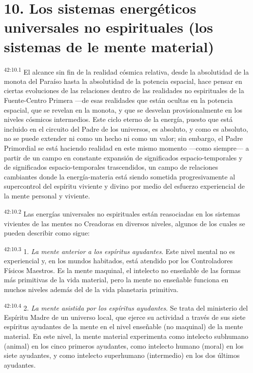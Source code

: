 \section*{10. Los sistemas energéticos universales no espirituales (los sistemas de le mente material)}
\par
\textsuperscript{42:10.1} El alcance sin fin de la realidad cósmica relativa, desde la absolutidad de la monota del Paraíso hasta la absolutidad de la potencia espacial, hace pensar en ciertas evoluciones de las relaciones dentro de las realidades no espirituales de la Fuente-Centro Primera ---de esas realidades que están ocultas en la potencia espacial, que se revelan en la monota, y que se desvelan provisionalmente en los niveles cósmicos intermedios. Este ciclo eterno de la energía, puesto que está incluido en el circuito del Padre de los universos, es absoluto, y como es absoluto, no se puede extender ni como un hecho ni como un valor; sin embargo, el Padre Primordial se está haciendo realidad en este mismo momento ---como siempre--- a partir de un campo en constante expansión de significados espacio-temporales y de significados espacio-temporales trascendidos, un campo de relaciones cambiantes donde la energía-materia está siendo sometida progresivamente al supercontrol del espíritu viviente y divino por medio del esfuerzo experiencial de la mente personal y viviente.

\par
\textsuperscript{42:10.2} Las energías universales no espirituales están reasociadas en los sistemas vivientes de las mentes no Creadoras en diversos niveles, algunos de los cuales se pueden describir como sigue:

\par
\textsuperscript{42:10.3} 1. \textit{La mente anterior a los espíritus ayudantes}. Este nivel mental no es experiencial y, en los mundos habitados, está atendido por los Controladores Físicos Maestros. Es la mente maquinal, el intelecto no enseñable de las formas más primitivas de la vida material, pero la mente no enseñable funciona en muchos niveles además del de la vida planetaria primitiva.

\par
\textsuperscript{42:10.4} 2. \textit{La mente asistida por los espíritus ayudantes}. Se trata del ministerio del Espíritu Madre de un universo local, que ejerce su actividad a través de sus siete espíritus ayudantes de la mente en el nivel enseñable (no maquinal) de la mente material. En este nivel, la mente material experimenta como intelecto subhumano (animal) en los cinco primeros ayudantes, como intelecto humano (moral) en los siete ayudantes, y como intelecto superhumano (intermedio) en los dos últimos ayudantes.

